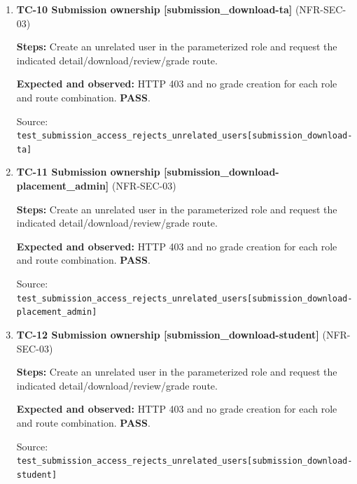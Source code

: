 \begin{enumerate}
\item \begin{minipage}[t]{\linewidth}\textbf{TC-10 Submission ownership [submission\_download-ta]} (NFR-SEC-03)\par

\textbf{Steps:} Create an unrelated user in the parameterized role and request the indicated detail/download/review/grade route.\par

\textbf{Expected and observed:} HTTP 403 and no grade creation for each role and route combination. \textbf{PASS}.\par

{\footnotesize Source: \nolinkurl{test_submission_access_rejects_unrelated_users[submission_download-ta]}}\end{minipage}

\item \begin{minipage}[t]{\linewidth}\textbf{TC-11 Submission ownership [submission\_download-placement\_admin]} (NFR-SEC-03)\par

\textbf{Steps:} Create an unrelated user in the parameterized role and request the indicated detail/download/review/grade route.\par

\textbf{Expected and observed:} HTTP 403 and no grade creation for each role and route combination. \textbf{PASS}.\par

{\footnotesize Source: \nolinkurl{test_submission_access_rejects_unrelated_users[submission_download-placement_admin]}}\end{minipage}

\item \begin{minipage}[t]{\linewidth}\textbf{TC-12 Submission ownership [submission\_download-student]} (NFR-SEC-03)\par

\textbf{Steps:} Create an unrelated user in the parameterized role and request the indicated detail/download/review/grade route.\par

\textbf{Expected and observed:} HTTP 403 and no grade creation for each role and route combination. \textbf{PASS}.\par

{\footnotesize Source: \nolinkurl{test_submission_access_rejects_unrelated_users[submission_download-student]}}\end{minipage}


\end{enumerate}
